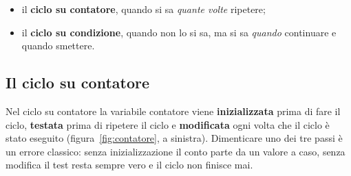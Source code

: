 \begin{itemize}
  \item il \textbf{ciclo su contatore}, quando si sa \textit{quante volte}
        ripetere;
  \item il \textbf{ciclo su condizione}, quando non lo si sa, ma si sa
        \textit{quando} continuare e quando smettere.
\end{itemize}

\subsection{Il ciclo su contatore}

Nel ciclo su contatore la variabile contatore viene
\textbf{inizializzata} prima di fare il ciclo, \textbf{testata} prima di
ripetere il ciclo e \textbf{modificata} ogni volta che il ciclo è stato
eseguito (figura~\ref{fig:contatore}, a sinistra). Dimenticare uno dei tre
passi è un errore classico: senza inizializzazione il conto parte da un
valore a caso, senza modifica il test resta sempre vero e il ciclo non
finisce mai.

